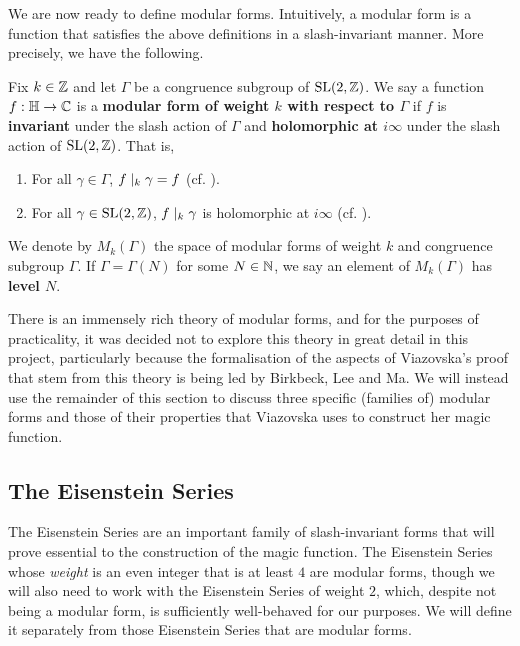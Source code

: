 We are now ready to define modular forms. Intuitively, a modular form is a function that satisfies the above definitions in a slash-invariant manner. More precisely, we have the following.

\begin{boxdefinition}
    Fix $k \in \mathbb{Z}$ and let $\Gamma$ be a congruence subgroup of $\operatorname{SL}\!\left( 2, \mathbb{Z} \right)$. We say a function $f : \mathbb{H} \to \mathbb{C}$ is a \textbf{modular form of weight $k$ with respect to $\Gamma$} if $f$ is \textbf{invariant} under the slash action of $\Gamma$ and \textbf{holomorphic at $i\infty$} under the slash action of $\operatorname{SL}\!\left( 2, \mathbb{Z} \right)$. That is,
    \begin{enumerate}
        \item For all $\gamma \in \Gamma$, $f \mid_k \gamma = f$ (cf. ).
        \item For all $\gamma \in \operatorname{SL}\!\left( 2, \mathbb{Z} \right)$, $f \mid_k \gamma$ is holomorphic at $i\infty$ (cf. ).
    \end{enumerate}
    We denote by $M_k(\Gamma)$ the space of modular forms of weight $k$ and congruence subgroup $\Gamma$. If $\Gamma = \Gamma(N)$ for some $N \in \mathbb{N}$, we say an element of $M_k(\Gamma)$ has \textbf{level $N$}.
\end{boxdefinition}

There is an immensely rich theory of modular forms, and for the purposes of practicality, it was decided not to explore this theory in great detail in this project, particularly because the formalisation of the aspects of Viazovska's proof that stem from this theory is being led by Birkbeck, Lee and Ma. We will instead use the remainder of this section to discuss three specific (families of) modular forms and those of their properties that Viazovska uses to construct her magic function.

\subsection{The Eisenstein Series}

The Eisenstein Series are an important family of slash-invariant forms that will prove essential to the construction of the magic function. The Eisenstein Series whose \textit{weight} is an even integer that is at least $4$ are modular forms, though we will also need to work with the Eisenstein Series of weight $2$, which, despite not being a modular form, is sufficiently well-behaved for our purposes. We will define it separately from those Eisenstein Series that are modular forms.

